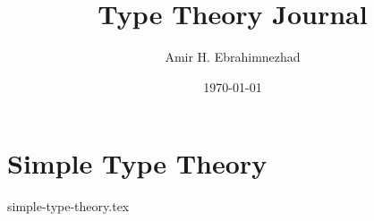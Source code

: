 \documentclass[10pt,a4paper, twocolumn]{article}
\newcounter{theo}
\begin{document}
    \title{Type Theory Journal}
    \author{Amir H. Ebrahimnezhad}
    \date{\today}
    \maketitle
    \tableofcontents

    \section{Simple Type Theory}\label{sec:simple-type-theory}
    {simple-type-theory.tex}


    
    
\end{document}
